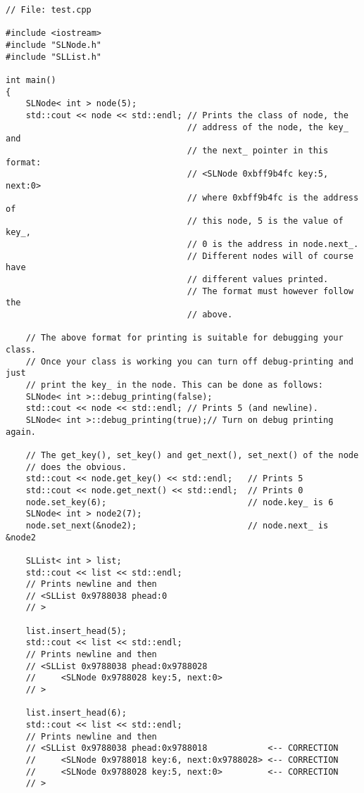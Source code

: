 \begin{Verbatim}[frame=single,commandchars=\~\@\$,fontsize=\footnotesize]
// File: test.cpp

#include <iostream>
#include "SLNode.h"
#include "SLList.h"

int main()
{
    SLNode< int > node(5);
    std::cout << node << std::endl; // Prints the class of node, the 
                                    // address of the node, the key_ and 
                                    // the next_ pointer in this format:
                                    // <SLNode 0xbff9b4fc key:5, next:0>
                                    // where 0xbff9b4fc is the address of
                                    // this node, 5 is the value of key_,
                                    // 0 is the address in node.next_.
                                    // Different nodes will of course have
                                    // different values printed.
                                    // The format must however follow the
                                    // above.

    // The above format for printing is suitable for debugging your class.
    // Once your class is working you can turn off debug-printing and just
    // print the key_ in the node. This can be done as follows:
    SLNode< int >::debug_printing(false);
    std::cout << node << std::endl; // Prints 5 (and newline).
    SLNode< int >::debug_printing(true);// Turn on debug printing again.
    
    // The get_key(), set_key() and get_next(), set_next() of the node 
    // does the obvious.
    std::cout << node.get_key() << std::endl;   // Prints 5 
    std::cout << node.get_next() << std::endl;  // Prints 0
    node.set_key(6);                            // node.key_ is 6
    SLNode< int > node2(7);
    node.set_next(&node2);                      // node.next_ is &node2

    SLList< int > list;
    std::cout << list << std::endl; 
    // Prints newline and then
    // <SLList 0x9788038 phead:0 
    // >

    list.insert_head(5);
    std::cout << list << std::endl; 
    // Prints newline and then
    // <SLList 0x9788038 phead:0x9788028 
    //     <SLNode 0x9788028 key:5, next:0>
    // >

    list.insert_head(6);
    std::cout << list << std::endl;
    // Prints newline and then
    // <SLList 0x9788038 phead:0x9788018            <-- CORRECTION
    //     <SLNode 0x9788018 key:6, next:0x9788028> <-- CORRECTION
    //     <SLNode 0x9788028 key:5, next:0>         <-- CORRECTION
    // >


\end{Verbatim}

